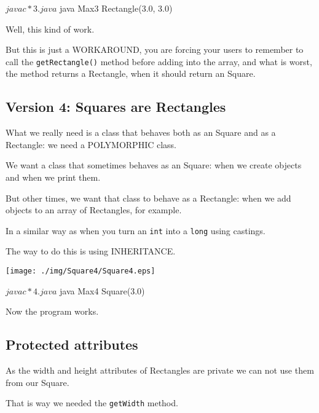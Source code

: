 \documentclass[a4paper, 9pt]{extarticle}
\begin{document}
\begin{blackboard}
$ javac *3.java
$ java Max3
Rectangle(3.0, 3.0)
\end{blackboard}

Well, this kind of work.

But this is just a WORKAROUND, you are forcing your users to remember to call
the \verb+getRectangle()+ method before adding into the array, and what is
worst, the method returns a Rectangle, when it should return an Square.



\newpage
\subsection{Version 4: Squares are Rectangles}

What we really need is a class that behaves both as an Square and as a
Rectangle: we need a POLYMORPHIC class.

We want a class that sometimes behaves as an Square: when we create objects
and when we print them.

But other times, we want that class to behave as a Rectangle: when we add
objects to an array of Rectangles, for example.

In a similar way as when you turn an \verb+int+ into a \verb+long+ using
castings.

The way to do this is using INHERITANCE.

\begin{multicols}{2}
  \begin{center}
    \texttt{[image: ./img/Square4/Square4.eps]}
  \end{center}
\columnbreak
\end{multicols}

\begin{blackboard}
$ javac *4.java
$ java Max4
Square(3.0)
\end{blackboard}

Now the program works.

\subsection{Protected attributes}

As the width and height attributes of Rectangles are private we can not use
them from our Square.

That is way we needed the \verb+getWidth+ method.
\end{document}

